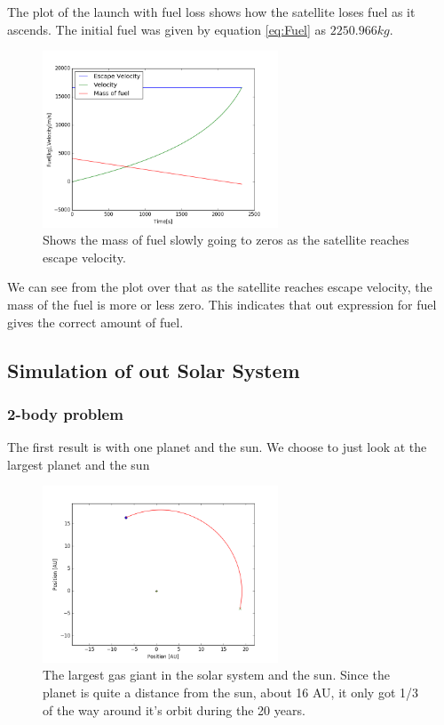 \documentclass[a4paper, 10pt]{article}
\begin{document}
The plot of the launch with fuel loss shows how the satellite loses fuel as it ascends. The initial fuel was given by equation \ref{eq:Fuel} as $2250.966 kg$.


\begin{figure}[H]
\begin{center}
\includegraphics[width = 70mm]{part1launchVarMass.png}
\caption{Shows the mass of fuel slowly going to zeros as the satellite reaches escape velocity.}
\end{center}
\end{figure}

We can see from the plot over that as the satellite reaches escape velocity, the mass of the fuel is more or less zero. This indicates that out expression for fuel gives the correct amount of fuel.

\subsection{Simulation of out Solar System}
\subsubsection{2-body problem}

The first result is with one planet and the sun. We choose to just look at the largest planet and the sun


\begin{figure}[H]
\begin{center}
\includegraphics[width = 70mm]{part2onePlanet.png}
\caption{The largest gas giant in the solar system and the sun. Since the planet is quite a distance from the sun, about 16 AU, it only got 1/3 of the way around it's orbit during the 20 years.}
\end{center}
\end{figure}
\end{document}

